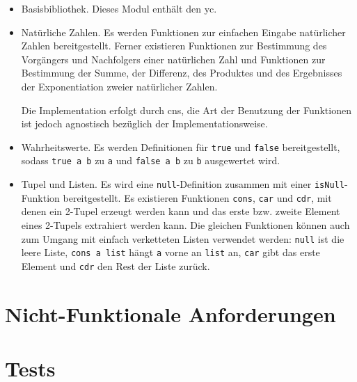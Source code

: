 \documentclass[parskip=full,11pt,twoside]{scrartcl}
\begin{document}
\begin{itemize}
	\item Basisbibliothek. Dieses Modul enthält den \gls{yc}.

	\item Natürliche Zahlen. Es werden Funktionen zur einfachen Eingabe natürlicher
		Zahlen bereitgestellt. Ferner existieren Funktionen zur Bestimmung des Vorgängers
		und Nachfolgers einer natürlichen Zahl und Funktionen zur Bestimmung der Summe,
		der Differenz, des Produktes und des Ergebnisses der Exponentiation zweier
		natürlicher Zahlen.

		Die Implementation erfolgt durch \glspl{cn}, die Art der Benutzung der
		Funktionen ist jedoch agnostisch bezüglich der Implementationsweise.

	\item Wahrheitswerte. Es werden Definitionen für \texttt{true} und \texttt{false}
		bereitgestellt, sodass \texttt{true a b} zu \texttt{a} und \texttt{false a b}
		zu \texttt{b} ausgewertet wird.

	\item Tupel und Listen. Es wird eine \texttt{null}-Definition zusammen mit einer
		\texttt{isNull}-Funktion bereitgestellt. Es existieren Funktionen
		\texttt{cons}, \texttt{car} und \texttt{cdr}, %
		mit denen ein 2-Tupel erzeugt werden kann und das erste bzw. zweite Element
		eines 2-Tupels extrahiert werden kann. Die gleichen Funktionen können auch zum
		Umgang mit einfach verketteten Listen verwendet werden: \texttt{null} ist die
		leere Liste, \texttt{cons a list} hängt \texttt{a} vorne an \texttt{list} an,
		\texttt{car} gibt das erste Element und \texttt{cdr} den Rest der Liste zurück.

\end{itemize}


\section{Nicht-Funktionale Anforderungen}


\section{Tests}
\end{document}
